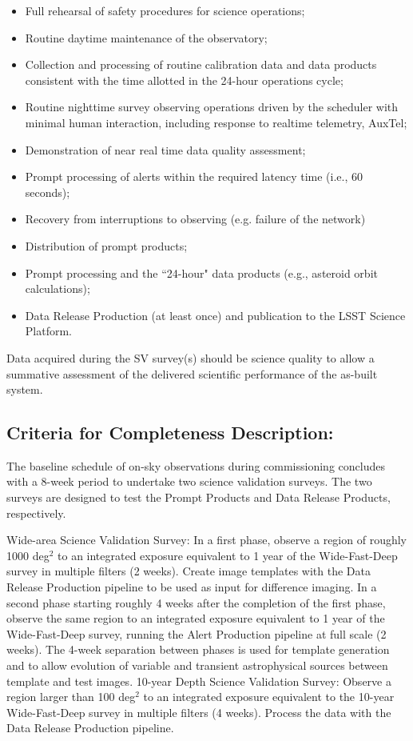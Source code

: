 \begin{itemize}
\item Full rehearsal of safety procedures for science operations;
\item Routine daytime maintenance of the observatory;
\item Collection and processing of routine calibration data and data products consistent with the time allotted in the 24-hour operations cycle;
\item Routine nighttime survey observing operations driven by the scheduler with minimal human interaction, including response to realtime telemetry, AuxTel;
\item Demonstration of near real time data quality assessment;
\item Prompt processing of alerts within the required latency time (i.e., 60 seconds);
\item Recovery from interruptions to observing (e.g. failure of the network)
\item Distribution of prompt products;
\item Prompt processing and the ``24-hour" data products (e.g., asteroid orbit calculations);
\item Data Release Production (at least once) and publication to the LSST Science Platform.
\end{itemize}

Data acquired during the SV survey(s) should be science quality to allow a summative assessment of the delivered scientific performance of the as-built system.

\subsection{Criteria for Completeness Description:}

The baseline schedule of on-sky observations during commissioning concludes with a 8-week period to undertake two science validation surveys. The two surveys are designed to test the Prompt Products and Data Release Products, respectively.

    Wide-area Science Validation Survey: In a first phase, observe a region of roughly 1000 deg$^2$ to an integrated exposure equivalent to 1 year of the Wide-Fast-Deep survey in multiple filters (2 weeks). Create image templates with the Data Release Production pipeline to be used as input for difference imaging. In a second phase starting roughly 4 weeks after the completion of the first phase, observe the same region to an integrated exposure equivalent to 1 year of the Wide-Fast-Deep survey, running the Alert Production pipeline at full scale (2 weeks). The 4-week separation between phases is used for template generation and to allow evolution of variable and transient astrophysical sources between template and test images.
    10-year Depth Science Validation Survey: Observe a region larger than 100 deg$^2$ to an integrated exposure equivalent to the 10-year Wide-Fast-Deep survey in multiple filters (4 weeks). Process the data with the Data Release Production pipeline.

